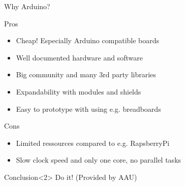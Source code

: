 \begin{frame}{Why Arduino?}
	\begin{block}{Pros}
		\begin{itemize}
			\item Cheap! Especially Arduino compatible boards
			\item Well documented hardware and software
			\item Big community and many \textcolor{ReneOrange}{3rd party libraries}
			\item Expandability with \textcolor{ReneOrange}{modules} and shields
			\item Easy to prototype with using e.g. breadboards
		\end{itemize}		
	\end{block}	
	\begin{block}{Cons}
		\begin{itemize}
			\item Limited ressources compared to e.g. RapsberryPi
			\item Slow clock speed and only one core, no parallel tasks
		\end{itemize}	
	\end{block}
	\begin{exampleblock}{Conclusion}<2>
		Do it! (Provided by AAU)	
	\end{exampleblock}		
\end{frame}